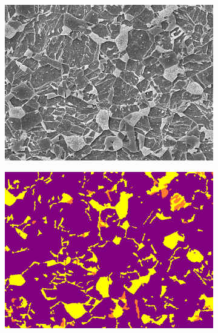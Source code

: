 \documentclass[]{article}
\begin{document}
\begin{figure}[!h]
\begin{subfigure}[b]{0.3\textwidth}
		\includegraphics[width=\textwidth]{images/inference/D3-type-O.jpg}
		\caption{}
		\label{fig:D3-type-orig}
	\end{subfigure}
	\hfill
	\begin{subfigure}[b]{0.3\textwidth}
		\centering
		\includegraphics[width=\textwidth]{images/inference/D3-type-L.png}
		\caption{}
		\label{fig:D3-type-label}
	\end{subfigure}
	\hfill
	\begin{subfigure}[b]{0.3\textwidth}
		\centering

\end{subfigure}
\end{figure}
\end{document}
